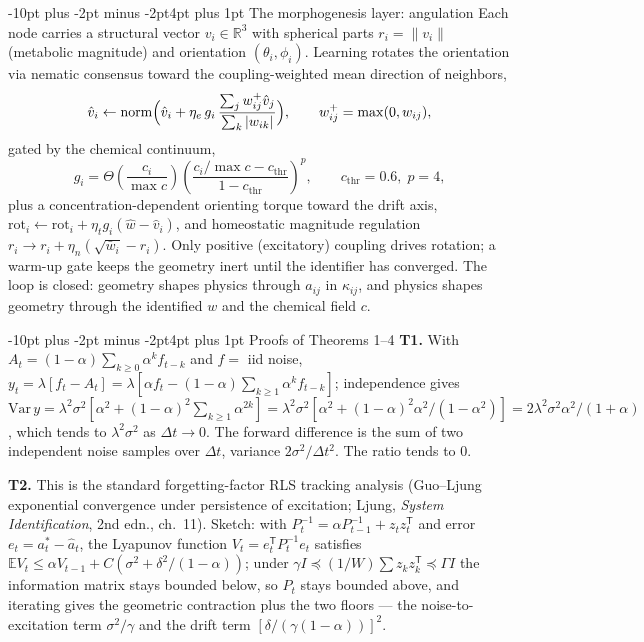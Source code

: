 \documentclass[10pt]{article}
\makeatletter
\renewcommand\subsection{\@startsection{subsection}{2}{\z@}%
  {-10pt plus -2pt minus -2pt}{4pt plus 1pt}%
  {\normalfont\bfseries\normalsize}}
\makeatother
\begin{document}
\subsection{The morphogenesis layer: angulation}
Each node carries a structural vector $v_i \in \mathbb{R}^3$ with spherical parts
$r_i = \|v_i\|$ (metabolic magnitude) and orientation $(\theta_i, \phi_i)$. Learning
rotates the orientation via nematic consensus toward the coupling-weighted mean
direction of neighbors,
\begin{equation}
\hat v_i \leftarrow \mathrm{norm}\Bigl(\hat v_i + \eta_e\, g_i\,
\frac{\sum_j w_{ij}^{+} \hat v_j}{\sum_k |w_{ik}|}\Bigr), \qquad
w_{ij}^{+} = \max(0, w_{ij}),
\end{equation}
gated by the chemical continuum,
\begin{equation}
g_i = \Theta\!\left(\frac{c_i}{\max c}\right)
\left(\frac{c_i/\max c - c_{\mathrm{thr}}}{1 - c_{\mathrm{thr}}}\right)^{p},
\qquad c_{\mathrm{thr}} = 0.6,\; p = 4,
\end{equation}
plus a concentration-dependent orienting torque toward the drift axis,
$\mathrm{rot}_i \leftarrow \mathrm{rot}_i + \eta_t g_i (\hat w - \hat v_i)$, and
homeostatic magnitude regulation $r_i \to r_i + \eta_n(\sqrt{\bar w_i} - r_i)$. Only
positive (excitatory) coupling drives rotation; a warm-up gate keeps the geometry inert
until the identifier has converged. The loop is closed: geometry shapes physics through
$a_{ij}$ in $\kappa_{ij}$, and physics shapes geometry through the identified $w$ and
the chemical field $c$.

\subsection{Proofs of Theorems 1--4}
\textbf{T1.} With $A_t = (1-\alpha)\sum_{k\ge 0}\alpha^k f_{t-k}$ and $f =$ iid
noise, $y_t = \lambda[f_t - A_t] = \lambda[\alpha f_t - (1-\alpha)\sum_{k\ge 1}
\alpha^k f_{t-k}]$; independence gives $\mathrm{Var}\,y =
\lambda^2\sigma^2[\alpha^2 + (1-\alpha)^2\sum_{k\ge1}\alpha^{2k}] =
\lambda^2\sigma^2[\alpha^2 + (1-\alpha)^2\alpha^2/(1-\alpha^2)] =
2\lambda^2\sigma^2\alpha^2/(1+\alpha)$, which tends to $\lambda^2\sigma^2$ as
$\Delta t \to 0$. The forward difference is the sum of two independent noise
samples over $\Delta t$, variance $2\sigma^2/\Delta t^2$. The ratio tends to $0$.

\textbf{T2.} This is the standard forgetting-factor RLS tracking analysis
(Guo--Ljung exponential convergence under persistence of excitation; Ljung,
\emph{System Identification}, 2nd edn., ch.~11). Sketch: with
$P_t^{-1} = \alpha P_{t-1}^{-1} + z_tz_t^{\mathsf T}$ and error
$e_t = a^*_t - \hat a_t$, the Lyapunov function $V_t = e_t^{\mathsf T}
P_t^{-1}e_t$ satisfies $\mathbb{E}V_t \le \alpha V_{t-1} + C(\sigma^2 + \delta^2
/(1-\alpha))$; under $\gamma I \preceq (1/W)\sum z_kz_k^{\mathsf T} \preceq
\Gamma I$ the information matrix stays bounded below, so $P_t$ stays bounded
above, and iterating gives the geometric contraction plus the two floors --- the
noise-to-excitation term $\sigma^2/\gamma$ and the drift term
$[\delta/(\gamma(1-\alpha))]^2$.
\end{document}
